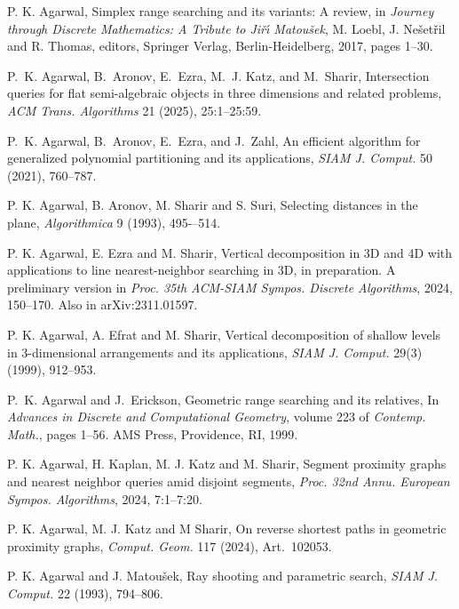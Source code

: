 \documentclass[11pt]{article}
\theoremstyle{definition}
\begin{document}
\begin{thebibliography}{}

P. K. Agarwal, 
Simplex range searching and its variants: A review,
in {\it Journey through Discrete Mathematics: A Tribute to Ji\v{r}\'{\i} Matou\v{s}ek},
M. Loebl, J. Ne\v{s}et\v{r}il and R. Thomas, editors,
Springer Verlag, Berlin-Heidelberg, 2017, pages 1--30.

P.~K. Agarwal, B.~Aronov, E.~Ezra, M.~J. Katz, and M.~Sharir,
Intersection queries for flat semi-algebraic objects in three dimensions and related problems,
{\it ACM Trans. Algorithms} 21 (2025), 25:1--25:59.

P.~K. Agarwal, B.~Aronov, E.~Ezra, and J.~Zahl,
An efficient algorithm for generalized polynomial partitioning and its applications,
{\it SIAM J. Comput.} 50 (2021), 760--787.

P. K. Agarwal, B. Aronov, M. Sharir and S. Suri, 
Selecting distances in the plane,
{\it Algorithmica} 9 (1993), 495-–514.

P. K. Agarwal, E. Ezra and M. Sharir,
Vertical decomposition in 3D and 4D with applications to line nearest-neighbor searching in 3D,
in preparation.
A preliminary version in {\it Proc. 35th ACM-SIAM Sympos. Discrete Algorithms}, 2024, 150--170.
Also in arXiv:2311.01597.

P. K. Agarwal, A. Efrat and M. Sharir,
Vertical decomposition of shallow levels in 3-dimensional arrangements and its applications,
{\it SIAM J. Comput.} 29(3) (1999), 912--953.

P.~K. Agarwal and J.~Erickson,
Geometric range searching and its relatives,
In {\em Advances in Discrete and Computational Geometry}, volume 223
  of {\em Contemp. Math.}, pages 1--56. AMS Press, Providence, RI, 1999.

P. K. Agarwal, H. Kaplan, M. J. Katz and M. Sharir,
Segment proximity graphs and nearest neighbor queries amid disjoint segments,
{\it Proc. 32nd Annu. European Sympos. Algorithms}, 2024, 7:1--7:20.

P. K. Agarwal, M. J. Katz and M Sharir,
On reverse shortest paths in geometric proximity graphs,
{\it Comput. Geom.} 117 (2024), Art.~102053. 

P. K. Agarwal and J. Matou\v{s}ek,
	Ray shooting and parametric search,
	{\it SIAM J. Comput.} 22 (1993), 794--806.


\end{thebibliography}
\end{document}
